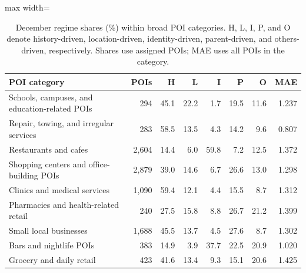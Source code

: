 \begin{table}[!htbp]
\centering
\begingroup
\singlespacing
\fontsize{9pt}{10.5pt}\selectfont
\setlength{\tabcolsep}{4pt}
\renewcommand{\arraystretch}{1.08}
\caption{December regime shares (\%) within broad POI categories. H, L, I, P, and O denote history-driven, location-driven, identity-driven, parent-driven, and others-driven, respectively. Shares use assigned POIs; MAE uses all POIs in the category.}
\label{tab:category_regime_mae}
\begin{adjustbox}{max width=\linewidth}
\begin{tabular}{lrrrrrrr}
\toprule
POI category & POIs & H & L & I & P & O & MAE \\
\midrule
Schools, campuses, and education-related POIs & 294 & 45.1 & 22.2 & 1.7 & 19.5 & 11.6 & 1.237 \\
Repair, towing, and irregular services & 283 & 58.5 & 13.5 & 4.3 & 14.2 & 9.6 & 0.807 \\
Restaurants and cafes & 2,604 & 14.4 & 6.0 & 59.8 & 7.2 & 12.5 & 1.372 \\
Shopping centers and office-building POIs & 2,879 & 39.0 & 14.6 & 6.7 & 26.6 & 13.0 & 1.298 \\
Clinics and medical services & 1,090 & 59.4 & 12.1 & 4.4 & 15.5 & 8.7 & 1.312 \\
Pharmacies and health-related retail & 240 & 27.5 & 15.8 & 8.8 & 26.7 & 21.2 & 1.399 \\
Small local businesses & 1,688 & 45.5 & 13.7 & 4.5 & 27.6 & 8.7 & 1.302 \\
Bars and nightlife POIs & 383 & 14.9 & 3.9 & 37.7 & 22.5 & 20.9 & 1.020 \\
Grocery and daily retail & 423 & 41.6 & 13.4 & 9.3 & 15.1 & 20.6 & 1.425 \\
\bottomrule
\end{tabular}
\end{adjustbox}
\endgroup
\end{table}
